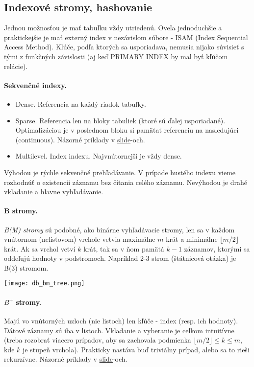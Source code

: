 \documentclass[10pt,a4paper]{article}
\begin{document}
\subsection{Indexové stromy, hashovanie}

Jednou možnosťou je mať tabuľku vždy utriedenú. Oveľa jednoduchšie a praktickejšie je mať externý index v nezávislom súbore - ISAM (Index Sequential Access Method).
Kľúče, podľa ktorých sa usporiadava, nemusia nijako súvisieť s tými z funkčných závislosti (aj keď PRIMARY INDEX by mal byť kľúčom relácie). 

\paragraph{Sekvenčné indexy.}
\begin{itemize}
\item Dense. Referencia na každý riadok tabuľky.
\item Sparse. Referencia len na bloky tabuliek (ktoré sú ďalej usporiadané). Optimalizáciou je v poslednom bloku si pamätať referenciu na nasledujúci (continuous). Názorné príklady v \href{http://www.dcs.fmph.uniba.sk/~plachetk/TEACHING/DB2011/db2011_10.pdf}{slide}-och. 
\item Multilevel. Index indexu. Najvnútornejší je vždy dense. 
\end{itemize}

Výhodou je rýchle sekvenčné prehľadávanie. V prípade hustého indexu vieme rozhodnúť o existencii záznamu bez čítania celého záznamu. 
Nevýhodou je drahé vkladanie a hlavne vyhľadávanie. 

\paragraph{B stromy.}
\emph{B(M) stromy} sú podobné, ako binárne vyhľadávacie stromy, len sa v každom vnútornom (nelistovom) vrchole vetvia maximálne $m$ krát a minimálne $\lfloor m/2 \rfloor$ krát. Ak sa vrchol vetví $k$ krát, tak sa v ňom pamätá $k-1$ záznamov, ktorými sa oddeľujú hodnoty v podstromoch. Napríklad 2-3 strom (štátnicová otázka) je B(3) stromom. 
 
\begin{center}
\texttt{[image: db\_bm\_tree.png]}
\end{center}

\paragraph{$B^+$ stromy.}
Majú vo vnútorných uzloch (nie listoch) len kľúče - index (resp. ich hodnoty). Dátové záznamy sú iba v listoch. 
Vkladanie a vyberanie je celkom intuitívne (treba rozobrať viacero prípadov, aby sa zachovala podmienka $\lfloor m/2 \rfloor \leq k \leq m$, kde $k$ je stupeň vrchola). Prakticky nastáva buď triviálny prípad, alebo sa to rieši rekurzívne. Názorné príklady v \href{http://www.dcs.fmph.uniba.sk/~plachetk/TEACHING/DB2011/db2011_10.pdf}{slide}-och. 
\end{document}

